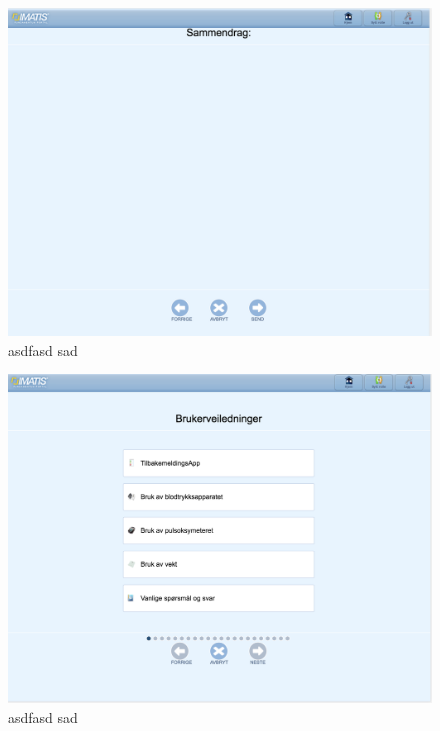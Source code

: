 \begin{figure}
\includegraphics[width=1.0\textwidth,center]{fig/helsami/tk_7_kols}
\caption{asdfasd sad}
\label{fig:helsami1}
\end{figure}

\begin{figure}
\includegraphics[width=1.0\textwidth,center]{fig/helsami/tk_8_brukerveil}
\caption{asdfasd sad}
\label{fig:helsami1}
\end{figure}

